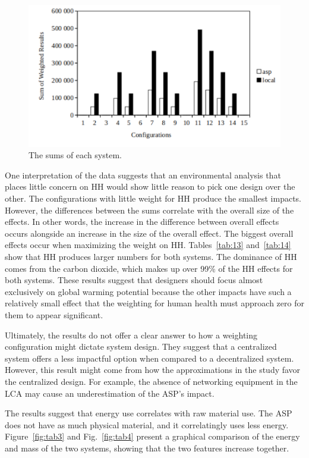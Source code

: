 \documentclass[final,journal,10pt,letterpaper,oneside,twocolumn,compsoc]%
{IEEEtran}
\begin{document}
\begin{figure}[htbp]
  \centering
    \includegraphics[scale=0.55]{sums}
  \caption{The sums of each system.}
  \label{fig:tab2}
\end{figure}

One interpretation of the data suggests that an environmental analysis that
places little concern on HH would show little reason to
pick one design over the other. The configurations with little weight for HH
produce the smallest impacts. However, the differences between the sums
correlate with the
overall size of the effects. In other words, the increase in the difference
between overall effects
occurs alongside an increase in the size of the overall effect. The biggest
overall effects occur when maximizing the weight on HH. Tables~\ref{tab:13} and~\ref{tab:14} show
that HH produces larger numbers for both systems. The dominance of
HH comes from the carbon dioxide, which makes up over 99\% of the
HH effects for both systems. These results suggest that
designers should focus almost exclusively on global warming potential because
the other impacts have such a relatively small effect that the weighting for
human health must approach zero for them to appear significant.

Ultimately, the results do not offer a clear answer to how a weighting
configuration might
dictate system design. They suggest that a centralized system offers
a less impactful option when compared to a decentralized system. However, this
result might come from how the approximations in the study favor
the centralized design. For example, the absence of networking equipment in the
LCA may cause an underestimation of the ASP's impact.

The results suggest
that energy use correlates with raw material use. The ASP does not have as much
physical material, and it correlatingly uses less energy. Figure~\ref{fig:tab3}
and Fig.~\ref{fig:tab4} present a graphical comparison of the
energy and mass of the two systems, showing that the two features increase
together.
\end{document}
